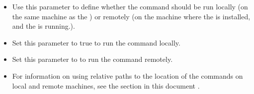 
\begin{itemize}
\item Use this parameter to define whether the command should be run locally (on the same machine as the \ite{}) or remotely (on the machine where the \gdagent{} is installed, and the \gdaut{} is running.). 
\item Set this parameter to true to run the command locally.
\item Set this parameter to \gdrefbooleanfalse to run the command remotely. 
\item  For information on using relative paths to the location of the commands on local and remote machines, see the section in this document .
\end{itemize}

